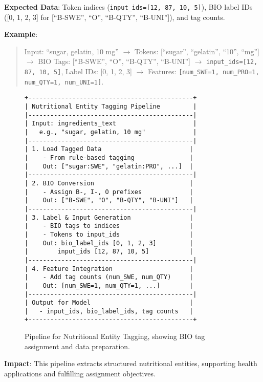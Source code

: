 \documentclass[11pt]{article}
\begin{document}
\textbf{Expected Data}: Token indices (\texttt{input\_ids=[12, 87, 10, 5]}), BIO label IDs ([0, 1, 2, 3] for [``B-SWE'', ``O'', ``B-QTY'', ``B-UNI'']), and tag counts.

\textbf{Example}:
\begin{quote}
Input: ``sugar, gelatin, 10 mg'' $\to$ Tokens: [``sugar'', ``gelatin'', ``10'', ``mg''] $\to$ BIO Tags: [``B-SWE'', ``O'', ``B-QTY'', ``B-UNI''] $\to$ \texttt{input\_ids=[12, 87, 10, 5]}, Label IDs: [0, 1, 2, 3] $\to$ Features: \texttt{[num\_SWE=1, num\_PRO=1, num\_QTY=1, num\_UNI=1]}.
\end{quote}

\begin{figure}[h]
\centering
\begin{lstlisting}[basicstyle=\ttfamily\scriptsize,breaklines=true,columns=flexible,frame=single,xleftmargin=0pt]
+---------------------------------------------+
| Nutritional Entity Tagging Pipeline         |
|---------------------------------------------|
| Input: ingredients_text                     |
|   e.g., "sugar, gelatin, 10 mg"             |
|---------------------------------------------|
| 1. Load Tagged Data                        |
|    - From rule-based tagging               |
|    Out: ["sugar:SWE", "gelatin:PRO", ...]  |
|---------------------------------------------|
| 2. BIO Conversion                          |
|    - Assign B-, I-, O prefixes             |
|    Out: ["B-SWE", "O", "B-QTY", "B-UNI"]   |
|---------------------------------------------|
| 3. Label & Input Generation                |
|    - BIO tags to indices                   |
|    - Tokens to input_ids                   |
|    Out: bio_label_ids [0, 1, 2, 3]         |
|        input_ids [12, 87, 10, 5]           |
|---------------------------------------------|
| 4. Feature Integration                     |
|    - Add tag counts (num_SWE, num_QTY)     |
|    Out: [num_SWE=1, num_QTY=1, ...]        |
|---------------------------------------------|
| Output for Model                           |
|   - input_ids, bio_label_ids, tag counts   |
+---------------------------------------------+
\end{lstlisting}
\caption{Pipeline for Nutritional Entity Tagging, showing BIO tag assignment and data preparation.}
\label{fig:entity_tagging_pipeline}
\end{figure}

\textbf{Impact}: This pipeline extracts structured nutritional entities, supporting health applications and fulfilling assignment objectives.
\end{document}
